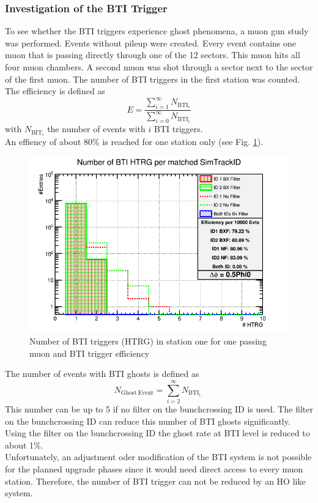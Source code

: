 \subsubsection{Investigation of the BTI Trigger}
To see whether the BTI triggers experience ghost phenomena, a muon gun study was performed. Events without pileup were created. Every event contains one muon that is passing directly through one of the 12 sectors. This muon hits all four muon chambers. A second muon was shot through a sector next to the sector of the first muon. The number of BTI triggers in the first station was counted.\\
The efficiency is defined as
\begin{equation}
E=\frac{\sum_{i = 1}^\infty N_{\mathrm{BTI}_i}}{\sum_{i = 0}^\infty N_{\mathrm{BTI}_i}}
\end{equation}
with $N_{\mathrm{BIT}_i}$ the number of events with $i$ BTI triggers.\\
An effiency of about 80\% is reached for one station only (see Fig. \ref{BTIEfficiency}).
\begin{figure}[htbp]
\begin{minipage}[t]{0.95\textwidth}
\includegraphics[width=\textwidth]{Figures/scheuch/SectorGunPt100dPhi0_5Phi0_h1dFilteredBtiHitsPerEvtSL1.png}
\caption{Number of BTI triggers (HTRG) in station one for one passing muon and BTI trigger efficiency}
\label{BTIEfficiency}
\end{minipage}
\end{figure}
The number of events with BTI ghosts is defined as
\begin{equation}
N_{\mathrm{Ghost\ Event}} = \sum_{i = 2}^\infty N_{\mathrm{BTI}_{i\cdot}}
\end{equation}
This number can be up to 5 if no filter on the bunchcrossing ID is used. The filter on the bunchcrossing ID can reduce this number of BTI ghosts significantly. Using the filter on the bunchcrossing ID the ghost rate at BTI level is reduced to about 1\%.\\
Unfortunately, an adjustment oder modification of the BTI system is not possible for the planned upgrade phases since it would need direct access to every muon station. Therefore, the number of BTI trigger can not be reduced by an HO like system.
